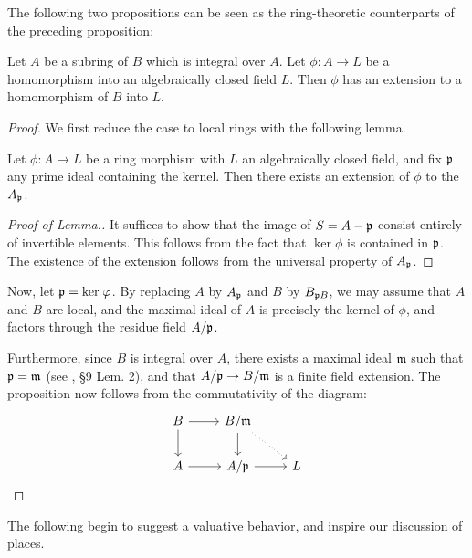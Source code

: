 The following two propositions can be seen as the ring-theoretic
counterparts of the preceding proposition:

\begin{prop}\label{prop_lang_3_1}
Let $A$ be a subring of $B$ which is integral over $A$. Let
$\phi: A \to L$ be a homomorphism into an algebraically closed 
field $L$. Then $\phi$ has an extension to a homomorphism of $B$
into $L$.
\end{prop}

\begin{proof}
We first reduce the case to local rings with the following lemma.

\begin{lem}\label{lem_lang_3_1}
Let $\phi : A \to L$ be a ring morphism with $L$ an algebraically
closed field, and fix $\mathfrak{p}$ any prime ideal containing the
kernel. Then there exists an extension of $\phi$ to the 
$A_{\mathfrak{p}}$.
\end{lem}
\begin{proof}[Proof of Lemma.]
It suffices to show that the image of $S = A - \mathfrak{p}$ consist
entirely of invertible elements. This follows from the fact that
$\ker \phi$ is contained in $\mathfrak{p}$. The existence of the
extension follows from the universal property of $A_{\mathfrak{p}}$.
\end{proof}

Now, let $\mathfrak{p} = \mathrm{ker}\; \varphi$. By replacing $A$ by $A_{\mathfrak{p}}$
and $B$ by $B_{\mathfrak{p}B}$, we may assume that $A$ and $B$ are
local, and the maximal ideal of $A$ is precisely the kernel of $\phi$,
and factors through the residue field $A/\mathfrak{p}$.

Furthermore, since $B$ is integral over $A$, there exists a maximal
ideal $\mathfrak{m}$ such that $\mathfrak{p} = \mathfrak{m}$ (see 
\cite{MatsCA}, \S9 Lem. 2), and that $A/\mathfrak{p} \to B/\mathfrak{m}$ is
a finite field extension. The proposition now follows from the
commutativity of the diagram:
\[
\begin{tikzcd}
B \arrow{r} \arrow{d} 
& B/\ideal{m} \arrow{d} \arrow[dotted]{rd} \\
A \arrow{r} 
& A/\ideal{p} \arrow{r}
& L
\end{tikzcd}
\]
\end{proof}

The following begin to suggest a valuative behavior, and inspire 
our discussion of places.

